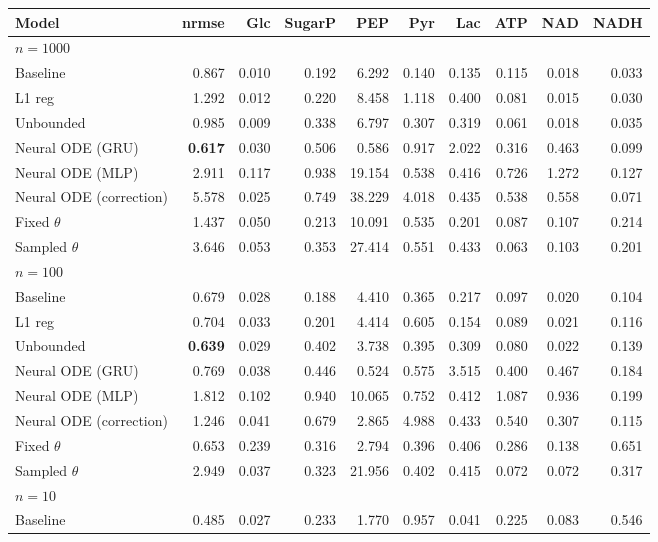 \begin{tabular}{lrrrrrrrrr}
\toprule
Model & nrmse & Glc & SugarP & PEP & Pyr & Lac & ATP & NAD & NADH \\
\midrule
\multicolumn{10}{l}{\textbf{$n=1000$}} \\
Baseline & 0.867 & 0.010 & 0.192 & 6.292 & 0.140 & 0.135 & 0.115 & 0.018 & 0.033 \\
L1 reg & 1.292 & 0.012 & 0.220 & 8.458 & 1.118 & 0.400 & 0.081 & 0.015 & 0.030 \\
Unbounded & 0.985 & 0.009 & 0.338 & 6.797 & 0.307 & 0.319 & 0.061 & 0.018 & 0.035 \\
Neural ODE (GRU) & \textbf{0.617} & 0.030 & 0.506 & 0.586 & 0.917 & 2.022 & 0.316 & 0.463 & 0.099 \\
Neural ODE (MLP) & 2.911 & 0.117 & 0.938 & 19.154 & 0.538 & 0.416 & 0.726 & 1.272 & 0.127 \\
Neural ODE (correction) & 5.578 & 0.025 & 0.749 & 38.229 & 4.018 & 0.435 & 0.538 & 0.558 & 0.071 \\
Fixed $\theta$ & 1.437 & 0.050 & 0.213 & 10.091 & 0.535 & 0.201 & 0.087 & 0.107 & 0.214 \\
Sampled $\theta$ & 3.646 & 0.053 & 0.353 & 27.414 & 0.551 & 0.433 & 0.063 & 0.103 & 0.201 \\
\midrule
\multicolumn{10}{l}{\textbf{$n=100$}} \\
Baseline & 0.679 & 0.028 & 0.188 & 4.410 & 0.365 & 0.217 & 0.097 & 0.020 & 0.104 \\
L1 reg & 0.704 & 0.033 & 0.201 & 4.414 & 0.605 & 0.154 & 0.089 & 0.021 & 0.116 \\
Unbounded & \textbf{0.639} & 0.029 & 0.402 & 3.738 & 0.395 & 0.309 & 0.080 & 0.022 & 0.139 \\
Neural ODE (GRU) & 0.769 & 0.038 & 0.446 & 0.524 & 0.575 & 3.515 & 0.400 & 0.467 & 0.184 \\
Neural ODE (MLP) & 1.812 & 0.102 & 0.940 & 10.065 & 0.752 & 0.412 & 1.087 & 0.936 & 0.199 \\
Neural ODE (correction) & 1.246 & 0.041 & 0.679 & 2.865 & 4.988 & 0.433 & 0.540 & 0.307 & 0.115 \\
Fixed $\theta$ & 0.653 & 0.239 & 0.316 & 2.794 & 0.396 & 0.406 & 0.286 & 0.138 & 0.651 \\
Sampled $\theta$ & 2.949 & 0.037 & 0.323 & 21.956 & 0.402 & 0.415 & 0.072 & 0.072 & 0.317 \\
\midrule
\multicolumn{10}{l}{\textbf{$n=10$}} \\
Baseline & 0.485 & 0.027 & 0.233 & 1.770 & 0.957 & 0.041 & 0.225 & 0.083 & 0.546 \\

\end{tabular}
